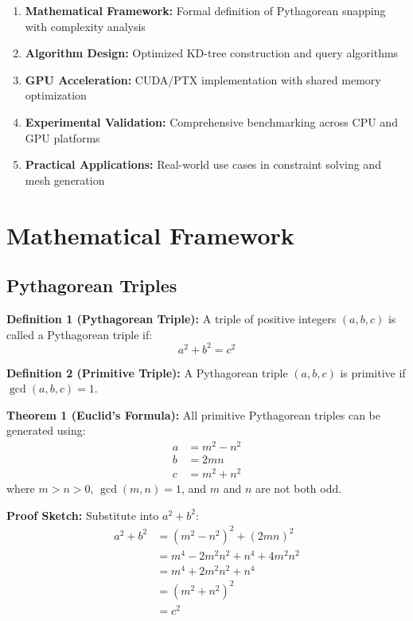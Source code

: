 \documentclass{article}
\begin{document}
\begin{enumerate}
    \item \textbf{Mathematical Framework:} Formal definition of Pythagorean snapping with complexity analysis
    \item \textbf{Algorithm Design:} Optimized KD-tree construction and query algorithms
    \item \textbf{GPU Acceleration:} CUDA/PTX implementation with shared memory optimization
    \item \textbf{Experimental Validation:} Comprehensive benchmarking across CPU and GPU platforms
    \item \textbf{Practical Applications:} Real-world use cases in constraint solving and mesh generation
\end{enumerate}

\section{Mathematical Framework}

\subsection{Pythagorean Triples}

\textbf{Definition 1 (Pythagorean Triple):} A triple of positive integers $(a, b, c)$ is called a Pythagorean triple if:
\begin{equation}
a^2 + b^2 = c^2
\end{equation}

\textbf{Definition 2 (Primitive Triple):} A Pythagorean triple $(a, b, c)$ is primitive if $\gcd(a, b, c) = 1$.

\textbf{Theorem 1 (Euclid's Formula):} All primitive Pythagorean triples can be generated using:
\begin{align}
a &= m^2 - n^2 \\
b &= 2mn \\
c &= m^2 + n^2
\end{align}
where $m > n > 0$, $\gcd(m, n) = 1$, and $m$ and $n$ are not both odd.

\textbf{Proof Sketch:} Substitute into $a^2 + b^2$:
\begin{align}
a^2 + b^2 &= (m^2 - n^2)^2 + (2mn)^2 \\
&= m^4 - 2m^2n^2 + n^4 + 4m^2n^2 \\
&= m^4 + 2m^2n^2 + n^4 \\
&= (m^2 + n^2)^2 \\
&= c^2
\end{align}
\end{document}
